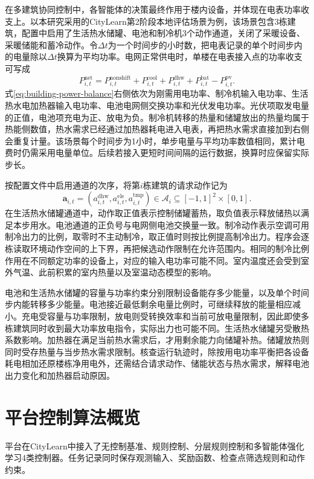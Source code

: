 在多建筑协同控制中，各智能体的决策最终作用于楼内设备，并体现在电表功率收支上。以本研究采用的CityLearn第2阶段本地评估场景为例，该场景包含3栋建筑，配置中启用了生活热水储罐、电池和制冷机3个动作通道，关闭了采暖设备、采暖储能和蓄冷动作。令$\Delta t$为一个时间步的小时数，把电表记录的单个时间步内的电量除以$\Delta t$换算为平均功率。电网正常供电时，单楼在电表接入点的功率收支可写成
\begin{equation}
    \label{eq:building-power-balance}
    P_{i,t}^{\mathrm{net}}=P_{i,t}^{\mathrm{nonshift}}+P_{i,t}^{\mathrm{cool}}
    +P_{i,t}^{\mathrm{dhw}}+P_{i,t}^{\mathrm{bat}}-P_{i,t}^{\mathrm{pv}} .
\end{equation}
式\eqref{eq:building-power-balance}右侧依次为刚需用电功率、制冷机输入电功率、生活热水电加热器输入电功率、电池电网侧交换功率和光伏发电功率。光伏项取发电量的正值，电池项充电为正、放电为负。制冷机转移的热量和储罐放出的热量均属于热能侧数值，热水需求已经通过加热器耗电进入电表，再把热水需求直接加到右侧会重复计量。该场景每个时间步为1小时，单步电量与平均功率数值相同，累计电费时仍需采用电量单位。后续若接入更短时间间隔的运行数据，换算时应保留实际步长。

按配置文件中启用通道的次序，将第$i$栋建筑的请求动作记为
\begin{equation}
    \label{eq:building-device-actions}
    \boldsymbol{a}_{i,t}=
    (a_{i,t}^{\mathrm{dhw}},a_{i,t}^{\mathrm{ele}},a_{i,t}^{\mathrm{tmp}})
    \in\mathcal A_i\subseteq [-1,1]^2\times[0,1].
\end{equation}
在生活热水储罐通道中，动作取正值表示控制储罐蓄热，取负值表示释放储热以满足本步用水。电池通道的正负号与电网侧电池交换量一致。制冷动作表示空调可用制冷出力的比例，取零时不主动制冷，取正值时则按比例提高制冷出力。程序会逐栋读取环境动作空间的上下界，再把候选动作限制在允许范围内。相同的制冷比例作用在不同额定功率的设备上，对应的输入电功率可能不同。室内温度还会受到室外气温、此前积累的室内热量以及室温动态模型的影响。

电池和生活热水储罐的容量与功率约束分别限制设备能存多少能量，以及单个时间步内能转移多少能量。电池接近最低剩余电量比例时，可继续释放的能量相应减小。充电受容量与功率限制，放电则受转换效率和当前可放电量限制，因此即使多栋建筑同时收到最大功率放电指令，实际出力也可能不同。生活热水储罐另受散热系数影响。加热器在满足当前热水需求后，才用剩余能力向储罐补热。储罐放热则同时受存热量与当步热水需求限制。核查运行轨迹时，除按用电功率平衡把各设备耗电相加还原楼栋净用电外，还需结合请求动作、储能状态与热水需求，解释电池出力变化和加热器启动原因。

\section{平台控制算法概览}
平台在CityLearn中接入了无控制基准、规则控制、分层规则控制和多智能体强化学习4类控制器。任务记录同时保存观测输入、奖励函数、检查点筛选规则和动作约束。

